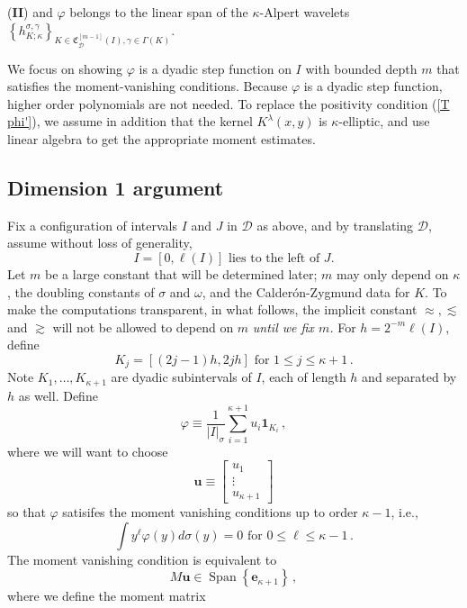 \documentclass{amsart}%
\theoremstyle{plain}
\numberwithin{equation}{section}
\begin{document}
(\textbf{II}) and $\varphi$ belongs to the linear span of the $\kappa$-Alpert
wavelets $\left\{  h_{K;\kappa}^{\sigma,\gamma}\right\}  _{K\in\mathfrak{C}%
_{\mathcal{D}}^{\left[  m-1\right]  }\left(  I \right)  ,\gamma
\in\Gamma\left(  K\right)  }$.

We focus on showing $\varphi$ is a dyadic step function on $I$ with bounded depth $m$ that satisfies the moment-vanishing conditions. Because $\varphi$ is a dyadic step function, higher order polynomials are not needed. To replace the positivity condition (\ref{T phi'}), we assume in addition that the kernel $K^{\lambda}\left(  x,y\right)  $ is $\kappa
$-elliptic, and use linear algebra to get the appropriate moment estimates.

\subsection{Dimension 1 argument}
Fix a configuration of intervals $I$ and $J$ in $\mathcal{D}$ as above, and by translating $\mathcal{D}$, assume without loss of
generality,
\[
I=\left[  0,\ell\left(  I\right)  \right]  \text{ lies to the left of }J.
\]
Let $m$ be a large constant that will be determined later; $m$ may only depend on $\kappa$, the doubling constants of $\sigma$ and $\omega$, and the Calder\'on-Zygmund data for $K$. To make the computations transparent, in what follows, the implicit constant $\approx, \lesssim$ and $\gtrsim$ will not be allowed to depend on $m$ \emph{until we fix  $m$.} For $h = 2^{-m} \ell \left (I \right )$, define 
\[
	K_j = \left [ \left (2j-1 \right )h, 2 j h \right ] \text{ for } 1 \leq j \leq \kappa +1 \, .
\]
Note $K_1 , \ldots, K_{\kappa+1}$ are dyadic subintervals of $I$, each of length $h$ and separated by $h$ as well.  Define 
\[
	\varphi \equiv \frac{1}{ \left | I \right |_{\sigma}} \sum\limits_{i=1}^{\kappa+1} u_{i} \mathbf{1}_{K_i} \, ,
\]
where we will want to choose
\[
	\mathbf{u} \equiv \begin{bmatrix} u_1  \\ \vdots \\ u_{\kappa+1} \end{bmatrix} 
\] so that $\varphi$ satisifes the moment vanishing conditions up to order $\kappa-1$, i.e.,
\[
	\int y^{\ell} \varphi (y) d \sigma (y)= 0  \text{ for } 0 \leq \ell \leq \kappa-1 \, . 
\]
The moment vanishing condition is equivalent to 
\[
	M \mathbf{u} \in \operatorname{Span} \left \{ \mathbf{e}_{\kappa+1} \right \} \, ,
\]
where we define the moment matrix
\end{document}
